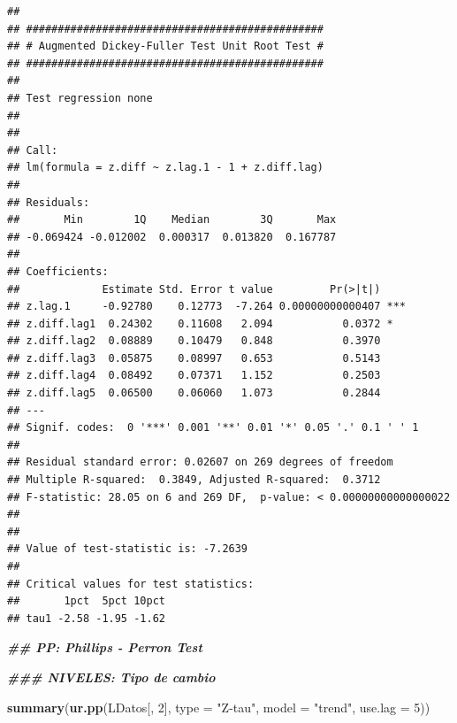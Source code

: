 \documentclass[
]{book}
\newenvironment{Shaded}{\begin{snugshade}}{\end{snugshade}}
\newcommand{\AttributeTok}[1]{\textcolor[rgb]{0.13,0.29,0.53}{#1}}
\newcommand{\DecValTok}[1]{\textcolor[rgb]{0.00,0.00,0.81}{#1}}
\newcommand{\DocumentationTok}[1]{\textcolor[rgb]{0.56,0.35,0.01}{\textbf{\textit{#1}}}}
\newcommand{\FunctionTok}[1]{\textcolor[rgb]{0.13,0.29,0.53}{\textbf{#1}}}
\newcommand{\NormalTok}[1]{#1}
\newcommand{\StringTok}[1]{\textcolor[rgb]{0.31,0.60,0.02}{#1}}
\begin{document}
\begin{verbatim}
## 
## ############################################### 
## # Augmented Dickey-Fuller Test Unit Root Test # 
## ############################################### 
## 
## Test regression none 
## 
## 
## Call:
## lm(formula = z.diff ~ z.lag.1 - 1 + z.diff.lag)
## 
## Residuals:
##       Min        1Q    Median        3Q       Max 
## -0.069424 -0.012002  0.000317  0.013820  0.167787 
## 
## Coefficients:
##             Estimate Std. Error t value         Pr(>|t|)    
## z.lag.1     -0.92780    0.12773  -7.264 0.00000000000407 ***
## z.diff.lag1  0.24302    0.11608   2.094           0.0372 *  
## z.diff.lag2  0.08889    0.10479   0.848           0.3970    
## z.diff.lag3  0.05875    0.08997   0.653           0.5143    
## z.diff.lag4  0.08492    0.07371   1.152           0.2503    
## z.diff.lag5  0.06500    0.06060   1.073           0.2844    
## ---
## Signif. codes:  0 '***' 0.001 '**' 0.01 '*' 0.05 '.' 0.1 ' ' 1
## 
## Residual standard error: 0.02607 on 269 degrees of freedom
## Multiple R-squared:  0.3849, Adjusted R-squared:  0.3712 
## F-statistic: 28.05 on 6 and 269 DF,  p-value: < 0.00000000000000022
## 
## 
## Value of test-statistic is: -7.2639 
## 
## Critical values for test statistics: 
##       1pct  5pct 10pct
## tau1 -2.58 -1.95 -1.62
\end{verbatim}

\begin{Shaded}
\begin{Highlighting}[]
\DocumentationTok{\#\# PP: Phillips {-} Perron Test}

\DocumentationTok{\#\#\# NIVELES: Tipo de cambio}

\FunctionTok{summary}\NormalTok{(}\FunctionTok{ur.pp}\NormalTok{(LDatos[, }\DecValTok{2}\NormalTok{], }\AttributeTok{type =} \StringTok{"Z{-}tau"}\NormalTok{, }\AttributeTok{model =} \StringTok{"trend"}\NormalTok{, }\AttributeTok{use.lag =} \DecValTok{5}\NormalTok{))}
\end{Highlighting}
\end{Shaded}
\end{document}

